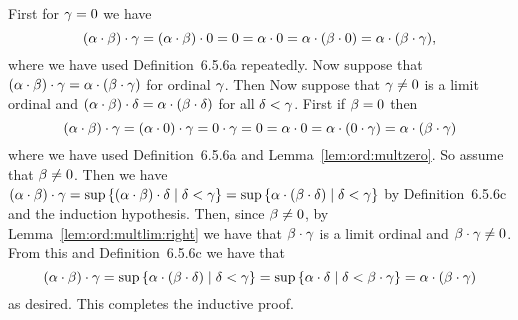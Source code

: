 {{    First for $\gamma=0$ we have
    $$
      (\alpha \cdot \beta) \cdot \gamma = (\alpha \cdot \beta) \cdot 0 = 0 = \alpha \cdot 0 = \alpha \cdot (\beta \cdot 0) = \alpha \cdot (\beta \cdot \gamma),
    $$
    where we have used Definition~6.5.6a repeatedly.
    Now suppose that $(\alpha \cdot \beta) \cdot \gamma = \alpha \cdot (\beta \cdot \gamma)$ for ordinal $\gamma$.
    Then
    Now suppose that $\gamma \neq 0$ is a limit ordinal and $(\alpha \cdot \beta) \cdot \delta = \alpha \cdot (\beta \cdot \delta)$ for all $\delta < \gamma$.
    First if $\beta = 0$ then
    $$
      (\alpha \cdot \beta) \cdot \gamma = (\alpha \cdot 0) \cdot \gamma = 0 \cdot \gamma = 0 = \alpha \cdot 0 = \alpha \cdot (0 \cdot \gamma) = \alpha \cdot (\beta \cdot \gamma)
    $$
    where we have used Definition~6.5.6a and Lemma~\ref{lem:ord:multzero}.
    So assume that $\beta \neq 0$.
    Then we have $(\alpha \cdot \beta) \cdot \gamma = \sup\left\{ (\alpha \cdot \beta) \cdot \delta \mid \delta < \gamma \right\} = \sup\left\{ \alpha \cdot (\beta \cdot \delta) \mid \delta < \gamma \right\}$ by Definition~6.5.6c and the induction hypothesis.
    Then, since $\beta \neq 0$, by Lemma~\ref{lem:ord:multlim:right} we have that $\beta \cdot \gamma$ is a limit ordinal and $\beta \cdot \gamma \neq 0$.
    From this and Definition~6.5.6c we have that
    $$
      (\alpha \cdot \beta) \cdot \gamma = \sup\left\{ \alpha \cdot (\beta \cdot \delta) \mid \delta < \gamma \right\} = \sup\left\{ \alpha \cdot \delta \mid \delta < \beta \cdot \gamma \right\} = \alpha \cdot (\beta \cdot \gamma)
    $$
    as desired.
    This completes the  inductive proof.
  }
}

